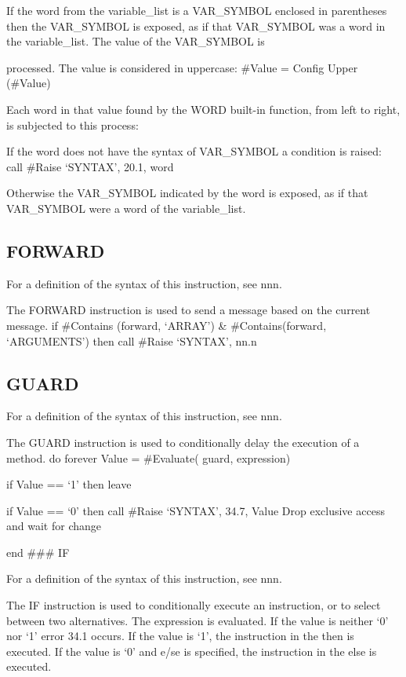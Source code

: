 If the word from the variable\_list is a VAR\_SYMBOL enclosed in
parentheses then the VAR\_SYMBOL is exposed, as if that VAR\_SYMBOL was
a word in the variable\_list. The value of the VAR\_SYMBOL is

processed. The value is considered in uppercase: \#Value = Config Upper
(\#Value)

Each word in that value found by the WORD built-in function, from left
to right, is subjected to this process:

If the word does not have the syntax of VAR\_SYMBOL a condition is
raised: call \#Raise `SYNTAX', 20.1, word

Otherwise the VAR\_SYMBOL indicated by the word is exposed, as if that
VAR\_SYMBOL were a word of the variable\_list.

\subsection{FORWARD}\label{forward}

For a definition of the syntax of this instruction, see nnn.

The FORWARD instruction is used to send a message based on the current
message. if \#Contains (forward, `ARRAY') \& \#Contains(forward,
`ARGUMENTS') then call \#Raise `SYNTAX', nn.n

\subsection{GUARD}\label{guard}

For a definition of the syntax of this instruction, see nnn.

The GUARD instruction is used to conditionally delay the execution of a
method. do forever Value = \#Evaluate( guard, expression)

if Value == `1' then leave

if Value == `0' then call \#Raise `SYNTAX', 34.7, Value Drop exclusive
access and wait for change

end \#\#\# IF

For a definition of the syntax of this instruction, see nnn.

The IF instruction is used to conditionally execute an instruction, or
to select between two alternatives. The expression is evaluated. If the
value is neither `0' nor `1' error 34.1 occurs. If the value is `1', the
instruction in the then is executed. If the value is `0' and e/se is
specified, the instruction in the else is executed.

